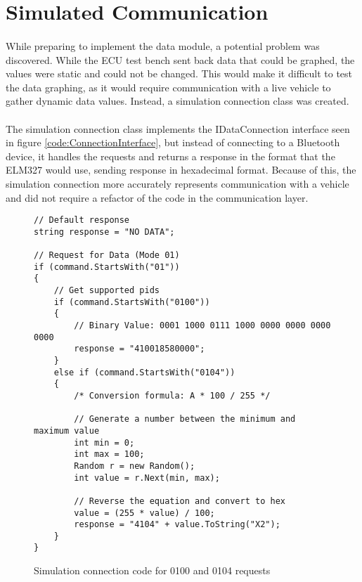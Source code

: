		\paragraph{}{
		}
		
		\paragraph{}{
		}						
		
\section{Simulated Communication}
		\paragraph{}{
		While preparing to implement the data module, a potential problem was discovered. While the ECU test bench sent back data that could be graphed, the values were static and could not be changed. This would make it difficult to test the data graphing, as it would require communication with a live vehicle to gather dynamic data values. Instead, a simulation connection class was created.
		}
		\paragraph{}{
		The simulation connection class implements the IDataConnection interface seen in figure \ref{code:ConnectionInterface}, but instead of connecting to a Bluetooth device, it handles the requests and returns a response in the format that the ELM327 would use, sending response in hexadecimal format. Because of this, the simulation connection more accurately represents communication with a vehicle and did not require a refactor of the code in the communication layer.
		}	
		\begin{figure}[h]
			\begin{lstlisting}
// Default response
string response = "NO DATA";

// Request for Data (Mode 01)
if (command.StartsWith("01"))
{
	// Get supported pids
	if (command.StartsWith("0100"))
    {
		// Binary Value: 0001 1000 0111 1000 0000 0000 0000 0000
		response = "410018580000";
	}
    else if (command.StartsWith("0104"))
	{
    	/* Conversion formula: A * 100 / 255 */
    	
    	// Generate a number between the minimum and maximum value
        int min = 0;
		int max = 100;
        Random r = new Random();
		int value = r.Next(min, max);

		// Reverse the equation and convert to hex
        value = (255 * value) / 100;
		response = "4104" + value.ToString("X2");
	}
}
			\end{lstlisting}
			\caption{Simulation connection code for 0100 and 0104 requests}
			\label{code:SimConnectionData}
		\end{figure}

